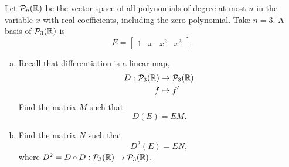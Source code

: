 \begin{exercise}
  \label{ex:hw03:polynomial-differentiation-powers}
  Let \(\mathcal P_n(\mathbb{R})\) be the vector space of all polynomials of
  degree at most \(n\) in the variable \(x\) with real coefficients,
  including the zero polynomial. Take \(n=3\). A basis of
  \(\mathcal P_3(\mathbb{R})\) is
  \[
    E=\begin{bmatrix}1&x&x^2&x^3\end{bmatrix}.
  \]
  \begin{enumerate}[(a)][2]
    \item Recall that differentiation is a linear map,
      \[
        \begin{aligned}
          D:\mathcal P_3(\mathbb{R})&\to\mathcal P_3(\mathbb{R})\\
          f&\mapsto f'
        \end{aligned}
      \]
      Find the matrix \(M\) such that
      \[
        D(E)=EM.
      \]
    \item Find the matrix \(N\) such that
      \[
        D^2(E)=EN,
      \]
      where \(D^2=D\circ D:\mathcal P_3(\mathbb{R})\to\mathcal P_3(\mathbb{R})\).
  \end{enumerate}
\end{exercise}

